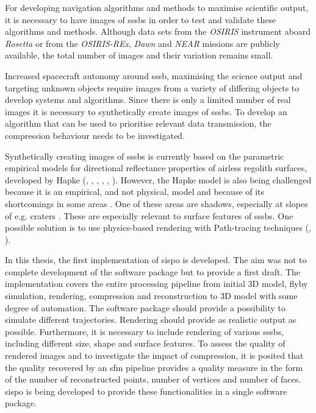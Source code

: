 For developing navigation algorithms and methods to maximise scientific output, it is necessary to have images of \gls{sssb}s in order to test and validate these algorithms and methods. Although data sets from the \textit{OSIRIS} instrument aboard \textit{Rosetta} \cite{osirisArchive} or from the \textit{OSIRIS-REx}, \textit{Dawn} and \textit{NEAR} missions \cite{palmer2014small} are publicly available, the total number of images and their variation remains small.

Increased spacecraft autonomy around \gls{sssb}, maximising the science output and targeting unknown objects require images from a variety of differing objects to develop systems and algorithms. Since there is only a limited number of real images it is necessary to synthetically create images of \gls{sssb}s. To develop an algorithm that can be used to prioritise relevant data transmission, the compression behaviour needs to be investigated. 

Synthetically creating images of \gls{sssb}s is currently based on the parametric empirical models for directional reflectance properties of airless regolith surfaces, developed by Hapke (\cite{hapke1981bidirectional}, \cite{hapke1984bidirectional}, \cite{hapke1986bidirectional}, \cite{hapke2002bidirectional}, \cite{hapke2008bidirectional}, \cite{hapke2012bidirectional}). However, the Hapke model is also being challenged because it is an empirical, and not physical, model and because of its shortcomings in some areas \cite{shkuratov2012critical}. One of these areas are shadows, especially at slopes of e.g. craters \cite{shkuratov2012critical}. These are especially relevant to surface features of \gls{sssb}s. One possible solution is to use physics-based rendering with Path-tracing techniques (\cite{shkuratov2012critical}, \cite{lafortune1996mathematical}).

In this thesis, the first implementation of \gls{sispo} is developed. The aim was not to complete development of the software package but to provide a first draft. The implementation covers the entire processing pipeline from initial 3D model, flyby simulation, rendering, compression and reconstruction to 3D model with some degree of automation. 
The software package should provide a possibility to simulate different trajectories. Rendering should provide as realistic output as possible. Furthermore, it is necessary to include rendering of various \gls{sssb}s, including different size, shape and surface features. To assess the quality of rendered images and to investigate the impact of compression, it is posited that the quality recovered by an \gls{sfm} pipeline provides a quality measure in the form of the number of reconstructed points, number of vertices and number of faces. \gls{sispo} is being developed to provide these functionalities in a single software package.


